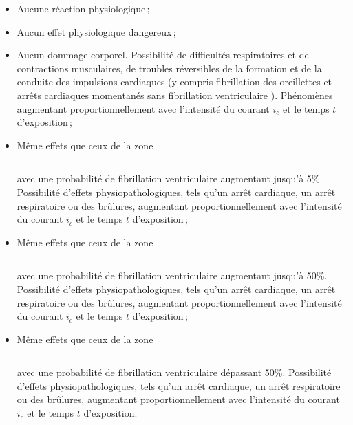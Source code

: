 \begin{figure}[h]
\begin{center}
\end{center}
\end{figure}

\begin{mdframed}
\begin{itemize}
\item[\textcolor{YellowGreen}{\rule{1.5em}{1.2ex}}] Aucune réaction physiologique\,;
\item[\textcolor{yellow}{\rule{1.5em}{1.2ex}}] Aucun effet physiologique dangereux\,;
\item[\textcolor{yellow!75!red}{\rule{1.5em}{1.2ex}}] Aucun dommage corporel. Possibilité de difficultés respiratoires et de contractions musculaires, de troubles réversibles de la formation et de la conduite des impulsions cardiaques (y compris fibrillation des oreillettes et arrêts cardiaques momentanés sans fibrillation ventriculaire ). Phénomènes augmentant proportionnellement avec l'intensité du courant $i_c$ et le temps $t$ d'exposition\,;
\item[\textcolor{yellow!50!red}{\rule{1.5em}{1.2ex}}] Même effets que ceux de la zone \textcolor{yellow!75!red}{\rule{1.5em}{1.2ex}} avec une probabilité de fibrillation ventriculaire augmentant jusqu'à 5\%. Possibilité d'effets physiopathologiques, tels qu'un arrêt cardiaque, un arrêt respiratoire ou des brûlures, augmentant proportionnellement avec l'intensité du courant $i_c$ et le temps $t$ d'exposition\,;
\item[\textcolor{yellow!25!red}{\rule{1.5em}{1.2ex}}] Même effets que ceux de la zone \textcolor{yellow!75!red}{\rule{1.5em}{1.2ex}} avec une probabilité de fibrillation ventriculaire augmentant jusqu'à 50\%. Possibilité d'effets physiopathologiques, tels qu'un arrêt cardiaque, un arrêt respiratoire ou des brûlures, augmentant proportionnellement avec l'intensité du courant $i_c$ et le temps $t$ d'exposition\,;
\item[\textcolor{red}{\rule{1.5em}{1.2ex}}] Même effets que ceux de la zone \textcolor{yellow!75!red}{\rule{1.5em}{1.2ex}} avec une probabilité de fibrillation ventriculaire dépassant 50\%. Possibilité d'effets physiopathologiques, tels qu'un arrêt cardiaque, un arrêt respiratoire ou des brûlures, augmentant proportionnellement avec l'intensité du courant $i_c$ et le temps $t$ d'exposition.
\end{itemize}
\end{mdframed}

